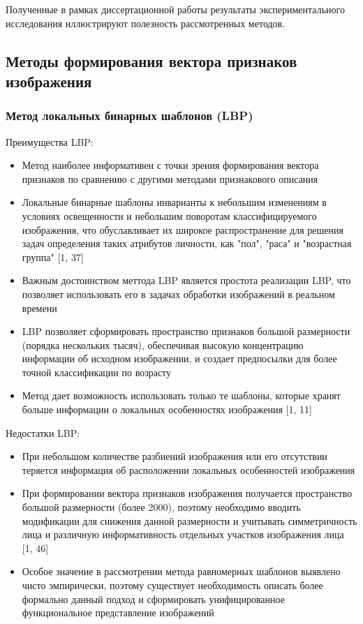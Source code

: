 \documentclass[12pt,a4paper]{article}
\begin{document}
Полученные в рамках диссертационной работы результаты экспериментального исследования иллюстрируют полезность рассмотренных методов.


\subsection{Методы формирования вектора признаков изображения}
\subsubsection{Метод локальных бинарных шаблонов (LBP)}
Преимущества LBP:
\begin{itemize}
    \item Метод наиболее информативен с точки зрения формирования вектора признаков по сравнению с другими методами признакового описания
    \item Локальные бинарные шаблоны инварианты к небольшим изменениям в условиях освещенности и небольшим поворотам классифицируемого изображения, что обуславливает их широкое распространение для решения задач определения таких атрибутов личности, как "пол", "раса" и "возрастная группа" [1, 37]
    \item Важным достоинством меттода LBP является простота реализации LBP, что позволяет использовать его в задачах обработки изображений в реальном времени
    \item LBP позволяет сформировать пространство признаков большой размерности (порядка нескольких тысяч), обеспечивая высокую концентрацию информации об исходном изображении, и создает предпосылки для более точной классификации по возрасту
    \item Метод дает возможность использовать только те шаблоны, которые хранят больше информации о локальных особенностях изображения [1, 11]
\end{itemize}

Недостатки LBP:
\begin{itemize}
    \item При небольшом количестве разбиений изображения или его отсутствии теряется информация об расположении локальных особенностей изображения
    \item При формировании вектора признаков изображения получается пространство большой размерности (более 2000), поэтому необходимо вводить модификации для снижения данной размерности и учитывать симметричность лица и различную информативность отдельных участков изображения лица [1, 46]
    \item Особое значение в рассмотрении метода равномерных шаблонов выявлено чисто эмпирически, поэтому существует необходимость описать более формально данный подход и сформировать унифицированное функциональное представление изображений
\end{itemize}
\end{document}
